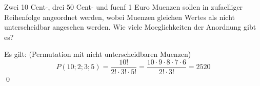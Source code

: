 \documentclass{abgabe}
\begin{document}
\begin{questions}
    \question
    Zwei 10 Cent-, drei 50 Cent- und fuenf 1 Euro Muenzen sollen in zufaelliger Reihenfolge angeordnet werden, wobei Muenzen gleichen Wertes als nicht unterscheidbar angesehen werden. 
    Wie viele Moeglichkeiten der Anordnung gibt es?
    \begin{solution}
        Es gilt:  (Permutation mit nicht unterscheidbaren Muenzen)
        \[
            P(10;2;3;5) = \frac{10!}{2! \cdot 3! \cdot 5!} = \frac{10 \cdot 9 \cdot 8 \cdot 7 \cdot 6}{2! \cdot 3!} = \num{2520}    
        \]\qed
    \end{solution}
\end{questions}
\end{document}
